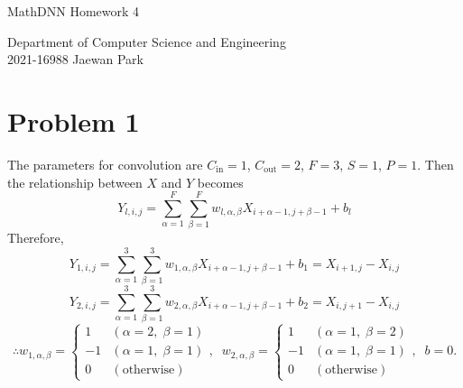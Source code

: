 \documentclass[10pt]{article}
\begin{document}
\begin{center}
    {\LARGE MathDNN Homework 4} \\
\end{center}
\begin{flushright}
    Department of Computer Science and Engineering \\
    2021-16988 Jaewan Park
\end{flushright}

\section*{Problem 1}
The parameters for convolution are $C_{\mathrm{in}} = 1$, $C_{\mathrm{out}} = 2$, $F = 3$, $S = 1$, $P = 1$.
Then the relationship between $X$ and $Y$ becomes
$$Y_{l, i, j} = \sum_{\alpha = 1}^{F}\sum_{\beta = 1}^{F}w_{l, \alpha, \beta}X_{i + \alpha - 1, j + \beta - 1} + b_{l}$$
Therefore,
$$Y_{1, i, j} = \sum_{\alpha = 1}^{3}\sum_{\beta = 1}^{3}w_{1, \alpha, \beta}X_{i + \alpha - 1, j + \beta - 1} + b_{1} = X_{i+1, j} - X_{i, j}$$
$$Y_{2, i, j} = \sum_{\alpha = 1}^{3}\sum_{\beta = 1}^{3}w_{2, \alpha, \beta}X_{i + \alpha - 1, j + \beta - 1} + b_{2} = X_{i, j+1} - X_{i, j}$$
$$\therefore w_{1, \alpha, \beta} = \begin{cases}
    1  & (\alpha = 2, \; \beta = 1) \\
    -1 & (\alpha = 1, \; \beta = 1) \\
    0  & (\textrm{otherwise})
\end{cases}, \;\; w_{2, \alpha, \beta} = \begin{cases}
    1  & (\alpha = 1, \; \beta = 2) \\
    -1 & (\alpha = 1, \; \beta = 1) \\
    0  & (\textrm{otherwise})
\end{cases}, \;\; b = 0.$$
\end{document}
